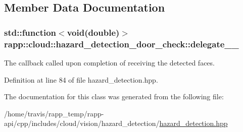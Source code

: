 \subsection{Member Data Documentation}
\hypertarget{classrapp_1_1cloud_1_1hazard__detection__door__check_a177ae21c6857e3e595e02128fb47247c}{
\subsubsection[{delegate\-\_\-\-\_\-}]{\setlength{\rightskip}{0pt plus 5cm}std\-::function$<$void(double)$>$ rapp\-::cloud\-::hazard\-\_\-detection\-\_\-door\-\_\-check\-::delegate\-\_\-\-\_\-\hspace{0.3cm}{\ttfamily [private]}}}\label{classrapp_1_1cloud_1_1hazard__detection__door__check_a177ae21c6857e3e595e02128fb47247c}


The callback called upon completion of receiving the detected faces. 



Definition at line 84 of file hazard\-\_\-detection.\-hpp.



The documentation for this class was generated from the following file\-:\begin{DoxyCompactItemize}
\item 
/home/travis/rapp\-\_\-temp/rapp-\/api/cpp/includes/cloud/vision/hazard\-\_\-detection/\hyperlink{hazard__detection_8hpp}{hazard\-\_\-detection.\-hpp}\end{DoxyCompactItemize}
